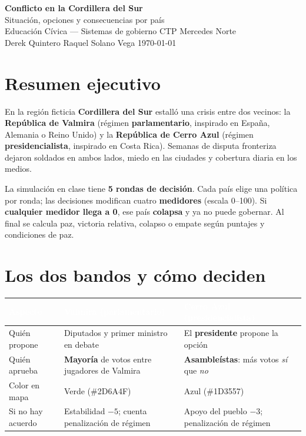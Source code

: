 \documentclass[11pt,a4paper]{article}
\newcommand{\headrow}[1]{\textcolor{white}{\textbf{#1}}}
\begin{document}
\begin{center}
{\LARGE\bfseries\color{cerro}Conflicto en la Cordillera del Sur}\\[0.4em]
{\large Situación, opciones y consecuencias por país}\\[0.35em]
{\normalsize Educación Cívica --- Sistemas de gobierno \quad CTP Mercedes Norte}\\[0.2em]
{\small Derek Quintero \quad Raquel Solano Vega \quad \today}
\end{center}

\vspace{0.5em}

\section{Resumen ejecutivo}

En la región ficticia \textbf{Cordillera del Sur} estalló una crisis entre dos vecinos: la \textbf{República de Valmira} (régimen \textbf{parlamentario}, inspirado en España, Alemania o Reino Unido) y la \textbf{República de Cerro Azul} (régimen \textbf{presidencialista}, inspirado en Costa Rica). Semanas de disputa fronteriza dejaron soldados en ambos lados, miedo en las ciudades y cobertura diaria en los medios.

La simulación en clase tiene \textbf{5 rondas de decisión}. Cada país elige una política por ronda; las decisiones modifican cuatro \textbf{medidores} (escala 0--100). Si \textbf{cualquier medidor llega a 0}, ese país \textbf{colapsa} y ya no puede gobernar. Al final se calcula paz, victoria relativa, colapso o empate según puntajes y condiciones de paz.

\section{Los dos bandos y cómo deciden}

\begin{tabularx}{\textwidth}{@{}lXX@{}}
\toprule
\rowcolor{cerro}
\headrow{Aspecto} & \headrow{Valmira (parlamentario)} & \headrow{Cerro Azul (presidencialista)} \\
\midrule
Quién propone & Diputados y primer ministro en debate & El \textbf{presidente} propone la opción \\
Quién aprueba & \textbf{Mayoría} de votos entre jugadores de Valmira & \textbf{Asambleístas}: más votos \emph{sí} que \emph{no} \\
Color en mapa & Verde (\#2D6A4F) & Azul (\#1D3557) \\
Si no hay acuerdo & Estabilidad $-5$; cuenta penalización de régimen & Apoyo del pueblo $-3$; penalización de régimen \\
\bottomrule
\end{tabularx}
\end{document}
